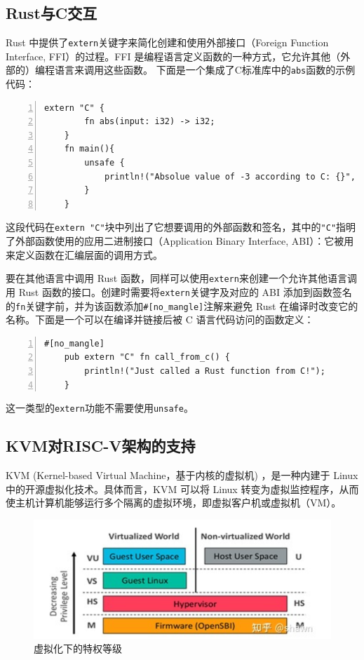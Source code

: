 \documentclass[UTF8,fontset=none,linespread=1.15]{ctexart}
\begin{document}
\subsection{Rust与C交互}
Rust 中提供了\texttt{extern}关键字来简化创建和使用外部接口（Foreign Function Interface, FFI）的过程。FFI 是编程语言定义函数的一种方式，它允许其他（外部的）编程语言来调用这些函数。
下面是一个集成了C标准库中的\texttt{abs}函数的示例代码：
\begin{lstlisting}[numbers=left]
	extern "C" {
		fn abs(input: i32) -> i32;
	}
	fn main(){
		unsafe {
			println!("Absolue value of -3 according to C: {}", abs(-3));
		}
	}
\end{lstlisting}
这段代码在\texttt{extern "C"}块中列出了它想要调用的外部函数和签名，其中的\texttt{"C"}指明了外部函数使用的应用二进制接口（Application Binary Interface, ABI）：它被用来定义函数在汇编层面的调用方式。

要在其他语言中调用 Rust 函数，同样可以使用\texttt{extern}来创建一个允许其他语言调用 Rust 函数的接口。创建时需要将\texttt{extern}关键字及对应的 ABI 添加到函数签名的\texttt{fn}关键字前，并为该函数添加\texttt{\#[no\_mangle]}注解来避免 Rust 在编译时改变它的名称。下面是一个可以在编译并链接后被 C 语言代码访问的函数定义：
\begin{lstlisting}[numbers=left]
	#[no_mangle]
	pub extern "C" fn call_from_c() {
		println!("Just called a Rust function from C!");
	}
\end{lstlisting}
这一类型的\texttt{extern}功能不需要使用\texttt{unsafe}。
\subsection{KVM对RISC-V架构的支持}
KVM (Kernel-based Virtual Machine，基于内核的虚拟机)  ，是一种内建于 Linux 中的开源虚拟化技术。具体而言，KVM 可以将 Linux 转变为虚拟监控程序，从而使主机计算机能够运行多个隔离的虚拟环境，即虚拟客户机或虚拟机（VM）。
\begin{figure}[!hbt]
	\centering
	\includegraphics[width=0.7\linewidth]{assets/W4}
	\caption{虚拟化下的特权等级}
	\label{fig:w4}
\end{figure}
\end{document}
